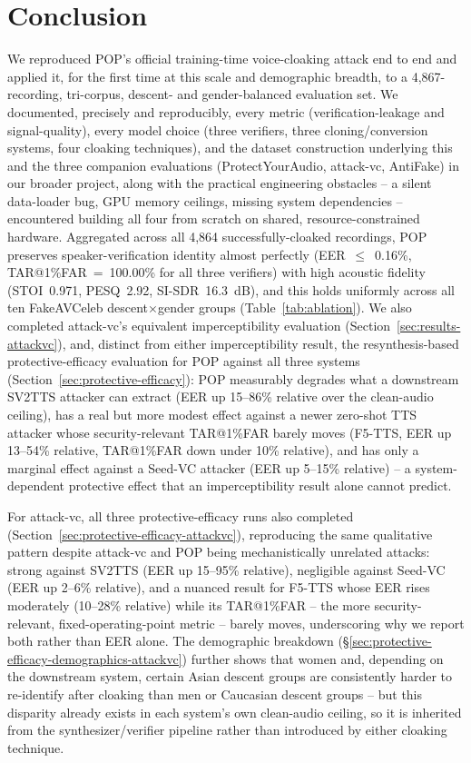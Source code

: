 \documentclass[11pt]{article}
\begin{document}
\section{Conclusion}
\label{sec:conclusion}
We reproduced POP's official training-time voice-cloaking attack end
to end and applied it, for the first time at this scale and
demographic breadth, to a 4,867-recording, tri-corpus, descent- and
gender-balanced evaluation set. We documented, precisely and
reproducibly, every metric (verification-leakage and signal-quality),
every model choice (three verifiers, three cloning/conversion systems,
four cloaking techniques), and the dataset construction underlying
this and the three companion evaluations (ProtectYourAudio, attack-vc,
AntiFake) in our broader project, along with the practical engineering
obstacles -- a silent data-loader bug, GPU memory ceilings, missing
system dependencies -- encountered building all four from scratch on
shared, resource-constrained hardware. Aggregated across all 4,864
successfully-cloaked recordings, POP preserves speaker-verification
identity almost perfectly (EER~$\leq$~0.16\%, TAR@1\%FAR~=~100.00\%
for all three verifiers) with high acoustic fidelity (STOI~0.971,
PESQ~2.92, SI-SDR~16.3~dB), and this holds uniformly across all ten
FakeAVCeleb descent$\times$gender groups (Table~\ref{tab:ablation}).
We also completed attack-vc's equivalent imperceptibility evaluation
(Section~\ref{sec:results-attackvc}), and, distinct from either
imperceptibility result, the resynthesis-based protective-efficacy
evaluation for POP against all three systems
(Section~\ref{sec:protective-efficacy}): POP measurably degrades what
a downstream SV2TTS attacker can extract (EER up 15--86\% relative
over the clean-audio ceiling), has a real but more modest effect
against a newer zero-shot TTS attacker whose security-relevant
TAR@1\%FAR barely moves (F5-TTS, EER up 13--54\% relative, TAR@1\%FAR
down under 10\% relative), and has only a marginal effect against a
Seed-VC attacker (EER up 5--15\% relative) -- a system-dependent
protective effect that an imperceptibility result alone cannot
predict.

For attack-vc, all three protective-efficacy runs also completed
(Section~\ref{sec:protective-efficacy-attackvc}), reproducing the same
qualitative pattern despite attack-vc and POP being mechanistically
unrelated attacks: strong against SV2TTS (EER up 15--95\% relative),
negligible against Seed-VC (EER up 2--6\% relative), and a nuanced
result for F5-TTS whose EER rises moderately (10--28\% relative) while
its TAR@1\%FAR -- the more security-relevant, fixed-operating-point
metric -- barely moves, underscoring why we report both rather than
EER alone. The demographic breakdown
(\S\ref{sec:protective-efficacy-demographics-attackvc}) further shows
that women and, depending on the downstream system, certain Asian
descent groups are consistently harder to re-identify after cloaking
than men or Caucasian descent groups -- but this disparity already
exists in each system's own clean-audio ceiling, so it is inherited
from the synthesizer/verifier pipeline rather than introduced by
either cloaking technique.
\end{document}
